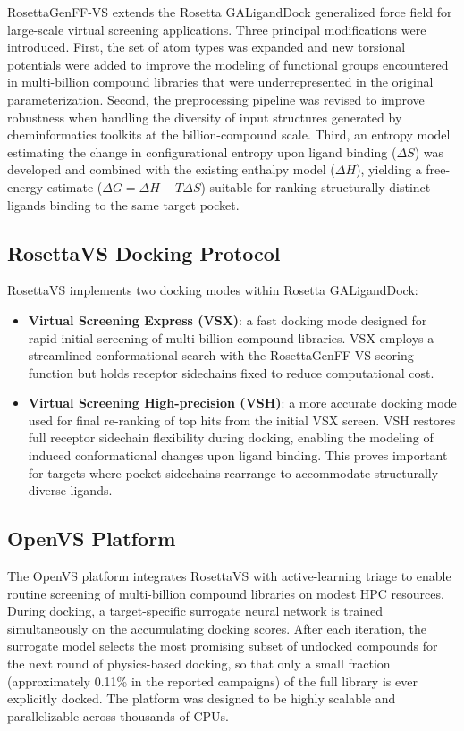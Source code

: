 \documentclass[10pt]{article}
\begin{document}
RosettaGenFF-VS extends the Rosetta GALigandDock generalized force field
\citep{leman2020rosetta} for large-scale virtual screening applications.
Three principal modifications were introduced. First, the set of atom types
was expanded and new torsional potentials were added to improve the modeling
of functional groups encountered in multi-billion compound libraries that
were underrepresented in the original parameterization. Second, the
preprocessing pipeline was revised to improve robustness when handling the
diversity of input structures generated by cheminformatics toolkits at the
billion-compound scale. Third, an entropy model estimating the change in
configurational entropy upon ligand binding ($\Delta S$) was developed and
combined with the existing enthalpy model ($\Delta H$), yielding a free-energy
estimate ($\Delta G = \Delta H - T \Delta S$) suitable for ranking
structurally distinct ligands binding to the same target pocket.

\subsection{RosettaVS Docking Protocol}

RosettaVS implements two docking modes within Rosetta GALigandDock:

\begin{itemize}
  \item \textbf{Virtual Screening Express (VSX)}: a fast docking mode designed
  for rapid initial screening of multi-billion compound libraries. VSX employs
  a streamlined conformational search with the RosettaGenFF-VS scoring
  function but holds receptor sidechains fixed to reduce computational cost.
  \item \textbf{Virtual Screening High-precision (VSH)}: a more accurate
  docking mode used for final re-ranking of top hits from the initial VSX
  screen. VSH restores full receptor sidechain flexibility during docking,
  enabling the modeling of induced conformational changes upon ligand binding.
  This proves important for targets where pocket sidechains rearrange to
  accommodate structurally diverse ligands.
\end{itemize}

\subsection{OpenVS Platform}

The OpenVS platform integrates RosettaVS with active-learning triage to enable
routine screening of multi-billion compound libraries on modest HPC resources.
During docking, a target-specific surrogate neural network is trained
simultaneously on the accumulating docking scores. After each iteration, the
surrogate model selects the most promising subset of undocked compounds for
the next round of physics-based docking, so that only a small fraction
(approximately 0.11\% in the reported campaigns) of the full library is ever
explicitly docked. The platform was designed to be highly scalable and
parallelizable across thousands of CPUs.
\end{document}
